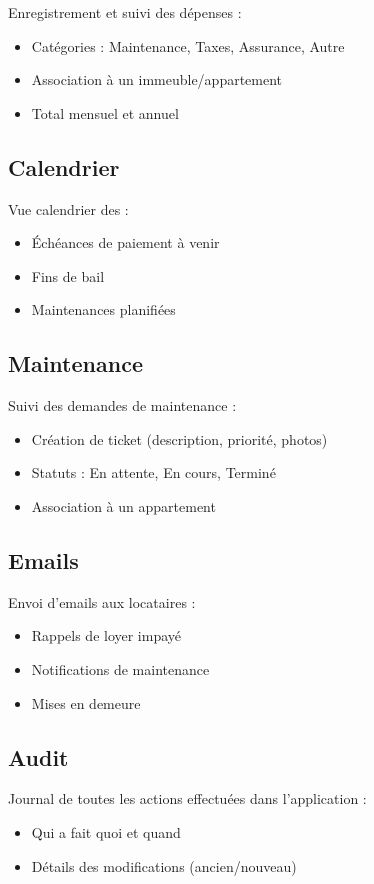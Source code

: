 \documentclass[a4paper,11pt]{article}
\begin{document}
Enregistrement et suivi des dépenses :
\begin{itemize}
  \item Catégories : Maintenance, Taxes, Assurance, Autre
  \item Association à un immeuble/appartement
  \item Total mensuel et annuel
\end{itemize}

\subsection{Calendrier}

Vue calendrier des :
\begin{itemize}
  \item Échéances de paiement à venir
  \item Fins de bail
  \item Maintenances planifiées
\end{itemize}

\subsection{Maintenance}

Suivi des demandes de maintenance :
\begin{itemize}
  \item Création de ticket (description, priorité, photos)
  \item Statuts : En attente, En cours, Terminé
  \item Association à un appartement
\end{itemize}

\subsection{Emails}

Envoi d'emails aux locataires :
\begin{itemize}
  \item Rappels de loyer impayé
  \item Notifications de maintenance
  \item Mises en demeure
\end{itemize}

\subsection{Audit}

Journal de toutes les actions effectuées dans l'application :
\begin{itemize}
  \item Qui a fait quoi et quand
  \item Détails des modifications (ancien/nouveau)
\end{itemize}
\end{document}
